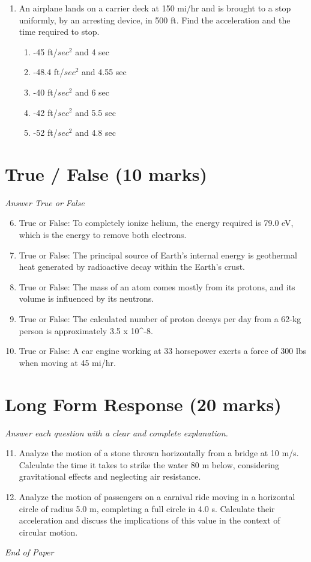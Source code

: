 \documentclass[12pt]{article}
\begin{document}
\begin{enumerate}[label=\arabic*.]
\begin{enumerate}[label=(\alph*)]
    \item 5 kT
    \item (1/4) k T
    \item 3 kT
\end{enumerate}
\item An airplane lands on a carrier deck at 150 mi/hr and is brought to a stop uniformly, by an arresting device, in 500 ft. Find the acceleration and the time required to stop.
\begin{enumerate}[label=(\alph*)]
    \item -45 ft/$sec^2$ and 4 sec
    \item -48.4 ft/$sec^2$ and 4.55 sec
    \item -40 ft/$sec^2$ and 6 sec
    \item -42 ft/$sec^2$ and 5.5 sec
    \item -52 ft/$sec^2$ and 4.8 sec
\end{enumerate}
\end{enumerate}

\section*{True / False (10 marks)}
\textit{Answer True or False}
\begin{enumerate}[label=\arabic*.]
\setcounter{enumi}{5}
\item True or False: To completely ionize helium, the energy required is 79.0 eV, which is the energy to remove both electrons.
\item True or False: The principal source of Earth's internal energy is geothermal heat generated by radioactive decay within the Earth's crust.
\item True or False: The mass of an atom comes mostly from its protons, and its volume is influenced by its neutrons.
\item True or False: The calculated number of proton decays per day from a 62-kg person is approximately 3.5 x 10^-8.
\item True or False: A car engine working at 33 horsepower exerts a force of 300 lbs when moving at 45 mi/hr.
\end{enumerate}

\section*{Long Form Response (20 marks)}
\textit{Answer each question with a clear and complete explanation.}
\begin{enumerate}[label=\arabic*.]
\setcounter{enumi}{10}
\item Analyze the motion of a stone thrown horizontally from a bridge at 10 m/s. Calculate the time it takes to strike the water 80 m below, considering gravitational effects and neglecting air resistance.
\item Analyze the motion of passengers on a carnival ride moving in a horizontal circle of radius 5.0 m, completing a full circle in 4.0 s. Calculate their acceleration and discuss the implications of this value in the context of circular motion.
\end{enumerate}

\vfill
\noindent\textit{End of Paper}
\end{document}

